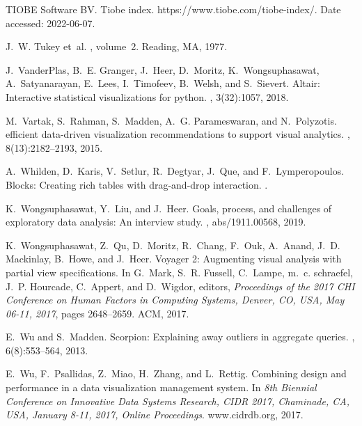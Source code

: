 \documentclass[11pt]{article}
\begin{document}
\begin{thebibliography}{10}
\begin{small}
{\relax TIOBE Software BV}.
\newblock Tiobe index.
\newblock https://www.tiobe.com/tiobe-index/. Date accessed: 2022-06-07.

J.~W. Tukey et~al.
, volume~2.
\newblock Reading, MA, 1977.

J.~VanderPlas, B.~E. Granger, J.~Heer, D.~Moritz, K.~Wongsuphasawat,
  A.~Satyanarayan, E.~Lees, I.~Timofeev, B.~Welsh, and S.~Sievert.
\newblock Altair: Interactive statistical visualizations for python.
, 3(32):1057, 2018.

M.~Vartak, S.~Rahman, S.~Madden, A.~G. Parameswaran, and N.~Polyzotis.
 efficient data-driven visualization recommendations to
  support visual analytics.
, 8(13):2182--2193, 2015.

A.~Whilden, D.~Karis, V.~Setlur, R.~Degtyar, J.~Que, and F.~Lymperopoulos.
\newblock Blocks: Creating rich tables with drag-and-drop interaction.
.

K.~Wongsuphasawat, Y.~Liu, and J.~Heer.
\newblock Goals, process, and challenges of exploratory data analysis: An
  interview study.
, abs/1911.00568, 2019.

K.~Wongsuphasawat, Z.~Qu, D.~Moritz, R.~Chang, F.~Ouk, A.~Anand, J.~D.
  Mackinlay, B.~Howe, and J.~Heer.
\newblock Voyager 2: Augmenting visual analysis with partial view
  specifications.
\newblock In G.~Mark, S.~R. Fussell, C.~Lampe, m.~c. schraefel, J.~P. Hourcade,
  C.~Appert, and D.~Wigdor, editors, {\em Proceedings of the 2017 {CHI}
  Conference on Human Factors in Computing Systems, Denver, CO, USA, May 06-11,
  2017}, pages 2648--2659. {ACM}, 2017.

E.~Wu and S.~Madden.
\newblock Scorpion: Explaining away outliers in aggregate queries.
, 6(8):553--564, 2013.

E.~Wu, F.~Psallidas, Z.~Miao, H.~Zhang, and L.~Rettig.
\newblock Combining design and performance in a data visualization management
  system.
\newblock In {\em 8th Biennial Conference on Innovative Data Systems Research,
  {CIDR} 2017, Chaminade, CA, USA, January 8-11, 2017, Online Proceedings}.
  www.cidrdb.org, 2017.


\end{small}
\end{thebibliography}
\end{document}
